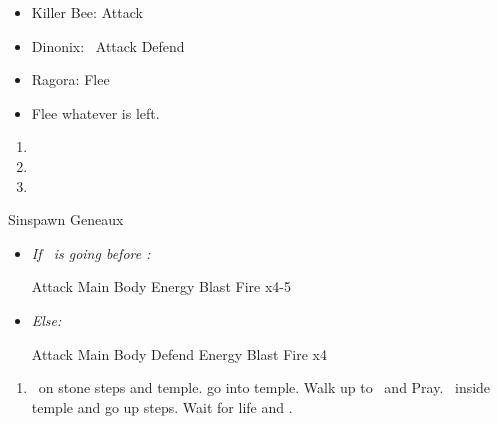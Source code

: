 \begin{encounters}
  \begin{itemize}
    \item Killer Bee: \wakkaf Attack
    \item Dinonix: \tidus\ Attack
    \yunaf Defend
    \item Ragora: Flee
    \item Flee whatever is left.
  \end{itemize}
\end{encounters}
\begin{enumerate}[resume]
  \item \sd
  \item \formation{\tidus}{\yuna}{\wakka}
  \item \save
\end{enumerate}
\begin{battle}[3000]{Sinspawn Geneaux}
  \begin{itemize}
    \item \textit{If \tidus\ is going before \yuna:}
          \begin{itemize}
            \tidusf Attack Main Body
            \summon{\valefor}
            \valeforf Energy Blast \od
            \valeforf Fire x4-5
          \end{itemize}
    \item \textit{Else:}
          \begin{itemize}
            \switch{\yuna}{\kimahri}
            \kimahrif Attack Main Body
            \tidusf Defend
            \summon{\valefor}
            \valeforf Energy Blast \od
            \valeforf Fire x4
          \end{itemize}
  \end{itemize}
\end{battle}
\begin{enumerate}[resume]
  \item \sd\ on stone steps and temple. go into temple. Walk up to \wakka\ and Pray. \sd\ inside temple and go up steps. Wait for life and \sd.
\end{enumerate}
